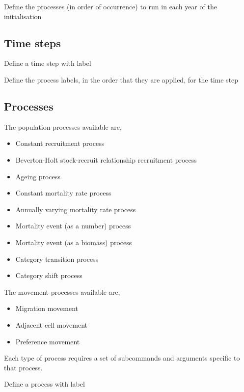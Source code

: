  {Define the processes (in order of occurrence) to run in each year of the initialisation}

\subsection{Time steps}

 {Define a time step with label}

 {Define the process labels, in the order that they are applied, for the time step}

\subsection{Processes}

The population processes available are, 

\begin{itemize}
	\item Constant recruitment process
  \item Beverton-Holt stock-recruit relationship recruitment process
	\item Ageing process
	\item Constant mortality rate process
	\item Annually varying mortality rate process
	\item Mortality event (as a number) process
	\item Mortality event (as a biomass) process
	\item Category transition process
	\item Category shift process
\end{itemize}

The movement processes available are,	

\begin{itemize}
	\item Migration movement
	\item Adjacent cell movement
	\item Preference movement
\end{itemize}

Each type of process requires a set of subcommands and arguments specific to that process.

 {Define a process with label}

